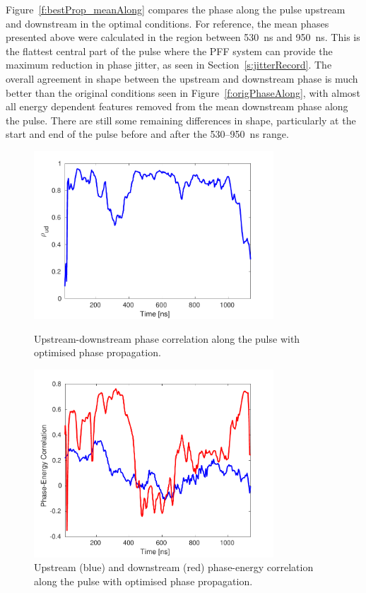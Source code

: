 Figure~\ref{f:bestProp_meanAlong} compares the phase along the pulse upstream and downstream in the optimal conditions. For reference, the mean phases presented above were calculated in the region between 530~ns and 950~ns. This is the flattest central part of the pulse where the PFF system can provide the maximum reduction in phase jitter, as seen in Section~\ref{s:jitterRecord}. The overall agreement in shape between the upstream and downstream phase is much better than the original conditions seen in Figure~\ref{f:origPhaseAlong}, with almost all energy dependent features removed from the mean downstream phase along the pulse. There are still some remaining differences in shape, particularly at the start and end of the pulse before and after the 530--950~ns range.

\begin{figure}
  \centering
  \includegraphics[width=0.8\textwidth]{Figures/propagation/bestProp_corrAlong}
  \caption{Upstream-downstream phase correlation along the pulse with optimised phase propagation.}
  \label{f:bestProp_corrAlong}
  \includegraphics[width=0.8\textwidth]{Figures/propagation/bestProp_enCorrAlong}
  \caption{Upstream (blue) and downstream (red) phase-energy correlation along the pulse with optimised phase propagation.}
  \label{f:bestProp_enCorrAlong}
\end{figure}

